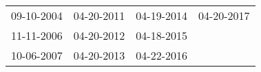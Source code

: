 \begin{supertabular}{llll}
 09-10-2004 &  04-20-2011 &  04-19-2014 &  04-20-2017 \\
 11-11-2006 &  04-20-2012 &  04-18-2015 &             \\
 10-06-2007 &  04-20-2013 &  04-22-2016 &             \\
\end{supertabular}

